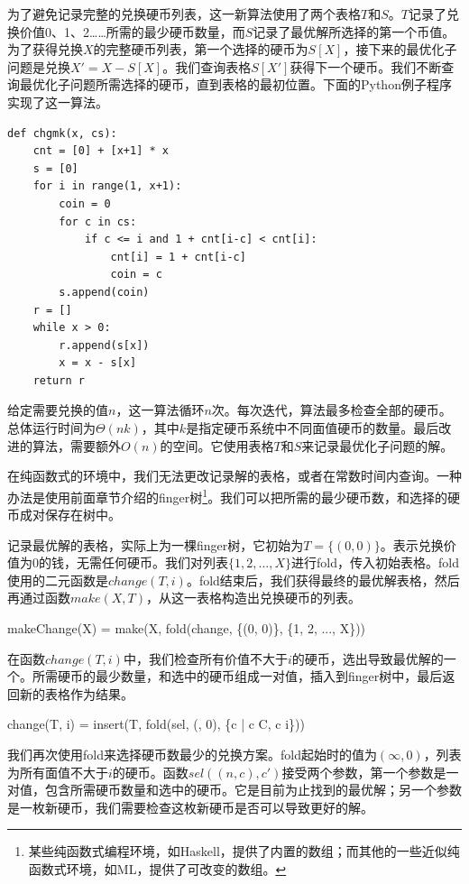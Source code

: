 \documentclass[b5paper]{ctexart}
\begin{document}
为了避免记录完整的兑换硬币列表，这一新算法使用了两个表格$T$和$S$。$T$记录了兑换价值0、1、2……所需的最少硬币数量，而$S$记录了最优解所选择的第一个币值。为了获得兑换$X$的完整硬币列表，第一个选择的硬币为$S[X]$，接下来的最优化子问题是兑换$X' = X - S[X]$。我们查询表格$S[X']$获得下一个硬币。我们不断查询最优化子问题所需选择的硬币，直到表格的最初位置。下面的Python例子程序实现了这一算法。

\lstset{language=Python}
\begin{lstlisting}
def chgmk(x, cs):
    cnt = [0] + [x+1] * x
    s = [0]
    for i in range(1, x+1):
        coin = 0
        for c in cs:
            if c <= i and 1 + cnt[i-c] < cnt[i]:
                cnt[i] = 1 + cnt[i-c]
                coin = c
        s.append(coin)
    r = []
    while x > 0:
        r.append(s[x])
        x = x - s[x]
    return r
\end{lstlisting}

给定需要兑换的值$n$，这一算法循环$n$次。每次迭代，算法最多检查全部的硬币。总体运行时间为$\Theta(nk)$，其中$k$是指定硬币系统中不同面值硬币的数量。最后改进的算法，需要额外$O(n)$的空间。它使用表格$T$和$S$来记录最优化子问题的解。

在纯函数式的环境中，我们无法更改记录解的表格，或者在常数时间内查询。一种办法是使用前面章节介绍的finger树\footnote{某些纯函数式编程环境，如Haskell，提供了内置的数组；而其他的一些近似纯函数式环境，如ML，提供了可改变的数组。}。我们可以把所需的最少硬币数，和选择的硬币成对保存在树中。

记录最优解的表格，实际上为一棵finger树，它初始为$T = \{(0, 0)\}$。表示兑换价值为0的钱，无需任何硬币。我们对列表$\{1, 2, ..., X\}$进行fold，传入初始表格。fold使用的二元函数是$change(T, i)$。fold结束后，我们获得最终的最优解表格，然后再通过函数$make(X, T)$，从这一表格构造出兑换硬币的列表。

\be
makeChange(X) = make(X, fold(change, \{(0, 0)\}, \{1, 2, ..., X\}))
\ee

在函数$change(T, i)$中，我们检查所有价值不大于$i$的硬币，选出导致最优解的一个。所需硬币的最少数量，和选中的硬币组成一对值，插入到finger树中，最后返回新的表格作为结果。

\be
change(T, i) = insert(T, fold(sel, (\infty, 0), \{c | c \in C, c \leq i\}))
\ee

我们再次使用fold来选择硬币数最少的兑换方案。fold起始时的值为$(\infty, 0)$，列表为所有面值不大于$i$的硬币。函数$sel((n, c), c')$接受两个参数，第一个参数是一对值，包含所需硬币数量和选中的硬币。它是目前为止找到的最优解；另一个参数是一枚新硬币，我们需要检查这枚新硬币是否可以导致更好的解。
\end{document}
